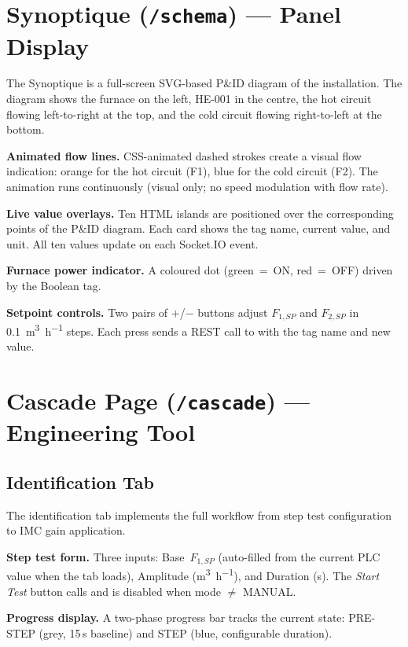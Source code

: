 \section{Synoptique (\texttt{/schema}) --- Panel Display}

The Synoptique is a full-screen SVG-based P\&ID diagram of the installation. The diagram
shows the furnace on the left, HE-001 in the centre, the hot circuit flowing
left-to-right at the top, and the cold circuit flowing right-to-left at the bottom.

\textbf{Animated flow lines.} CSS-animated dashed strokes create a visual flow
indication: orange for the hot circuit (F1), blue for the cold circuit (F2).
The animation runs continuously (visual only; no speed modulation with flow rate).

\textbf{Live value overlays.} Ten  HTML islands are positioned over
the corresponding points of the P\&ID diagram. Each card shows the tag name, current value,
and unit. All ten values update on each  Socket.IO event.

\textbf{Furnace power indicator.} A coloured dot (green~=~ON, red~=~OFF) driven by the
 Boolean tag.

\textbf{Setpoint controls.} Two pairs of $+$/$-$ buttons adjust $F_{1,SP}$ and
$F_{2,SP}$ in \SI{0.1}{\metre\cubed\per\hour} steps. Each press sends a REST call to
 with the tag name and new value.

\section{Cascade Page (\texttt{/cascade}) --- Engineering Tool}

\subsection{Identification Tab}

The identification tab implements the full workflow from step test configuration to IMC
gain application.

\textbf{Step test form.}
Three inputs: Base~$F_{1,SP}$ (auto-filled from the current PLC value when the tab loads),
Amplitude (\si{\metre\cubed\per\hour}), and Duration (\si{\second}). The \textit{Start Test}
button calls  and is disabled when mode $\neq$
MANUAL.

\textbf{Progress display.}
A two-phase progress bar tracks the current state: PRE-STEP (grey, 15\,s baseline) and
STEP (blue, configurable duration).

